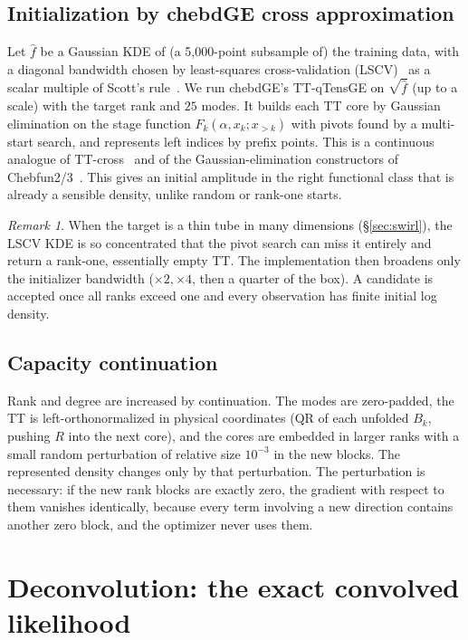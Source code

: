 \documentclass[11pt]{article}
\theoremstyle{definition}
\theoremstyle{remark}
\newtheorem{remark}[proposition]{Remark}
\begin{document}
\subsection{Initialization by chebdGE cross approximation}
Let $\hat f$ be a Gaussian KDE of (a 5{,}000-point subsample of) the training data, with a diagonal bandwidth chosen by
least-squares cross-validation (LSCV)~\cite{rudemo1982empirical,bowman1984alternative} as a scalar multiple of Scott's rule~\cite{scott2015multivariate}. We run
chebdGE's TT-qTensGE on $\sqrt{\hat f}$ (up to a scale) with the target rank and $25$ modes. It builds each TT core
by Gaussian elimination on the stage function $F_k(\alpha,x_k;x_{>k})$ with pivots found by a multi-start search,
and represents left indices by prefix points. This is a continuous analogue of TT-cross~\cite{oseledets2010ttcross} and of the Gaussian-elimination constructors of Chebfun2/3~\cite{townsend2013chebfun2,hashemi2017chebfun3}. This gives an initial amplitude in the right functional class that is
already a sensible density, unlike random or rank-one starts.
\begin{remark}
When the target is a thin tube in many dimensions (\S\ref{sec:swirl}), the LSCV KDE is so concentrated that the pivot
search can miss it entirely and return a rank-one, essentially empty TT. The implementation then broadens only the
initializer bandwidth ($\times2,\times4$, then a quarter of the box). A candidate is accepted once all ranks exceed one
and every observation has finite initial log density.
\end{remark}

\subsection{Capacity continuation}
Rank and degree are increased by continuation. The modes are zero-padded, the TT is left-orthonormalized in
physical coordinates (QR of each unfolded $B_k$, pushing $R$ into the next core), and the cores are embedded in
larger ranks with a small random perturbation of relative size $10^{-3}$ in the new blocks. The represented density
changes only by that perturbation. The perturbation is necessary: if the new rank blocks are exactly zero, the
gradient with respect to them vanishes identically, because every term involving a new direction contains another
zero block, and the optimizer never uses them.

\section{Deconvolution: the exact convolved likelihood}
\label{sec:deconv}
\end{document}
